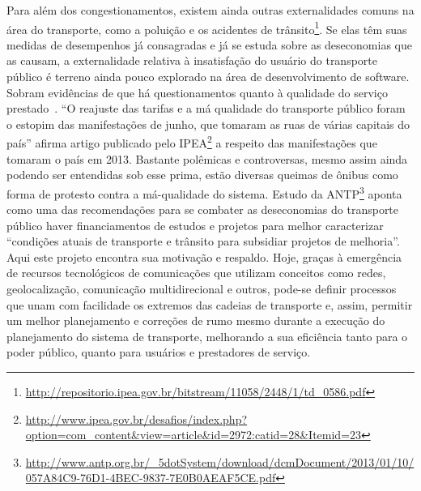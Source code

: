Para além dos congestionamentos, existem ainda outras externalidades comuns na área do transporte, como a poluição e os acidentes de trânsito\footnote{\url{http://repositorio.ipea.gov.br/bitstream/11058/2448/1/td_0586.pdf}}. Se elas têm suas medidas de desempenhos já consagradas e já se estuda sobre as deseconomias que as causam, a externalidade relativa à insatisfação do usuário do transporte público é terreno ainda pouco explorado na área de desenvolvimento de software. Sobram evidências de que há questionamentos quanto à qualidade do serviço prestado~\cite{Urbana-PE2010,Rodrigues,Rodrigues2006,Cellos2012}. “O reajuste das tarifas e a má qualidade do transporte público foram o estopim das manifestações de junho, que tomaram as ruas de várias capitais do país” afirma artigo publicado pelo IPEA\footnote{\url{http://www.ipea.gov.br/desafios/index.php?option=com_content&view=article&id=2972:catid=28&Itemid=23}} a respeito das manifestações que tomaram o país em 2013. Bastante polêmicas e controversas, mesmo assim ainda podendo ser entendidas sob esse prima, estão diversas queimas de ônibus como forma de protesto contra a má-qualidade do sistema. Estudo da ANTP\footnote{\url{http://www.antp.org.br/_5dotSystem/download/dcmDocument/2013/01/10/057A84C9-76D1-4BEC-9837-7E0B0AEAF5CE.pdf} } aponta como uma das recomendações para se combater as deseconomias do transporte público haver financiamentos de estudos e projetos para melhor caracterizar “condições atuais de transporte e trânsito para subsidiar projetos de melhoria”. Aqui este projeto encontra sua motivação e respaldo. Hoje, graças à emergência de recursos tecnológicos de comunicações que utilizam conceitos como redes, geolocalização, comunicação multidirecional e outros, pode-se definir processos que unam com facilidade os extremos das cadeias de transporte e, assim, permitir um melhor planejamento e correções de rumo mesmo durante a execução do planejamento do sistema de transporte, melhorando a sua eficiência tanto para o poder público, quanto para usuários e prestadores de serviço.
	

